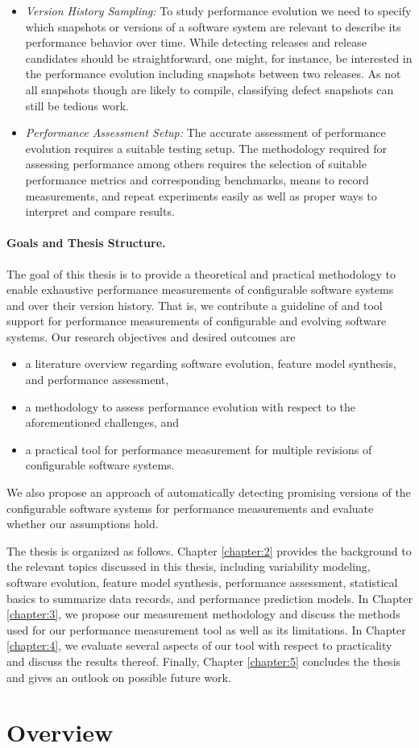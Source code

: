 \begin{itemize}
\item \emph{Version History Sampling:} To study performance evolution we need to
specify which snapshots or versions of a software system are relevant to
describe its performance behavior over time. While detecting releases and release candidates should be straightforward, one might, for instance, be interested in the performance evolution including snapshots
between two releases. As not all snapshots though are likely to compile,
classifying defect snapshots can still be tedious work.
\item \emph{Performance Assessment Setup:} The accurate assessment of
performance evolution requires a suitable testing setup. The methodology required for assessing performance
among others requires the selection of suitable performance metrics and
corresponding benchmarks, means to record measurements, and repeat experiments
easily as well as proper ways to interpret and compare results.
\end{itemize}

\paragraph{Goals and Thesis Structure.}
The goal of this thesis is to provide a theoretical and practical methodology to enable
exhaustive performance measurements of configurable software systems and over
their version history. That is, we contribute a guideline of and tool support
for performance measurements of configurable and evolving software systems. Our
research objectives and desired outcomes are

\begin{itemize}
\item a literature overview regarding software evolution, feature model
synthesis, and performance assessment,
\item a methodology to assess performance evolution with respect to the
aforementioned challenges, and
\item a practical tool for performance measurement for multiple revisions of
configurable software systems.
\end{itemize}

We also propose an approach of automatically detecting promising versions of the
configurable software systems for performance measurements and evaluate whether
our assumptions hold. 

The thesis is organized as follows. Chapter
\ref{chapter:2} provides the background to the relevant topics discussed in this thesis, including variability modeling, software evolution, feature model synthesis, performance
assessment, statistical basics to summarize data records, and performance
prediction models.
In Chapter \ref{chapter:3}, we propose our measurement methodology and discuss
the methods used for our performance measurement tool as well as its
limitations. In Chapter \ref{chapter:4}, we evaluate several aspects of our
tool with respect to practicality and discuss the results thereof. Finally,
Chapter \ref{chapter:5} concludes the thesis and gives an outlook on possible
future work.

\section{Overview}
